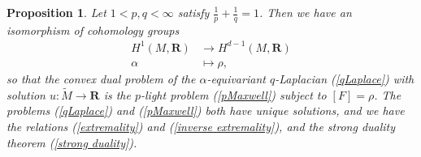 \documentclass[reqno,11pt]{amsart}
\newcommand{\RR}{\mathbf{R}}
\newtheorem{proposition}[theorem]{Proposition}
\theoremstyle{definition}
\numberwithin{equation}{section}
\begin{document}
\begin{proposition}\label{convex duality}
Let $1 < p, q < \infty$ satisfy $\frac{1}{p} + \frac{1}{q} = 1$.
Then we have an isomorphism of cohomology groups
\begin{align*}
H^1(M, \RR) &\to H^{d - 1}(M, \RR) \\
\alpha &\mapsto \rho,
\end{align*}
so that the convex dual problem of the $\alpha$-equivariant $q$-Laplacian (\ref{qLaplace}) with solution $u: \tilde M \to \RR$ is the $p$-light problem (\ref{pMaxwell}) subject to $[F] = \rho$.
The problems (\ref{qLaplace}) and (\ref{pMaxwell}) both have unique solutions, and we have the relations (\ref{extremality}) and (\ref{inverse extremality}), and the strong duality theorem (\ref{strong duality}).
\end{proposition}
\end{document}
